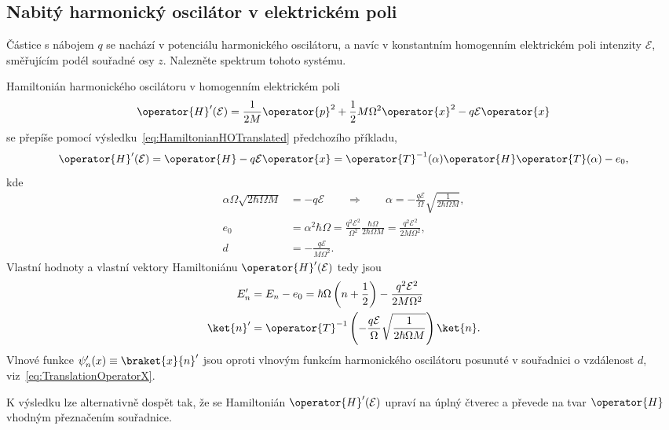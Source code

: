 \subsection{Nabitý harmonický oscilátor v elektrickém poli}
	Částice s nábojem $q$ se nachází v potenciálu harmonického oscilátoru, a navíc v konstantním homogenním elektrickém poli intenzity $\mathcal{E}$, směřujícím podél souřadné osy $z$.
	Nalezněte spektrum tohoto systému.
	
\begin{solution}
	Hamiltonián harmonického oscilátoru v homogenním elektrickém poli
	\begin{equation}\label{eq:HamiltonianHOCharged}
		\operator{H}'(\mathcal{E})=\frac{1}{2M}\operator{p}^{2}+\frac{1}{2}M\Omega^{2}\operator{x}^{2}
			-q\mathcal{E}\operator{x}
	\end{equation}
	se přepíše pomocí výsledku~\eqref{eq:HamiltonianHOTranslated} předchozího příkladu,
	\begin{equation}
		\operator{H}'(\mathcal{E})
			=\operator{H}-q\mathcal{E}\operator{x}
			=\operator{T}^{-1}(\alpha)\operator{H}\operator{T}(\alpha)-e_{0},
	\end{equation}
	kde
	\begin{subequations}
		\begin{align}
			\alpha\Omega\sqrt{2\hbar\Omega M}&=-q\mathcal{E}\qquad\Rightarrow\qquad
			\alpha=-\frac{q\mathcal{E}}{\Omega}\sqrt{\frac{1}{2\hbar\Omega M}},\\		
			e_{0}&=\alpha^{2}\hbar\Omega
				=\frac{q^{2}\mathcal{E}^{2}}{\Omega^{2}}\frac{\hbar\Omega}{2\hbar\Omega M}
				=\frac{q^{2}\mathcal{E}^{2}}{2M\Omega^{2}},\\
			d&=-\frac{q\mathcal{E}}{M\Omega^{2}}.
		\end{align}				
	\end{subequations}
	Vlastní hodnoty a vlastní vektory Hamiltoniánu $\operator{H}'(\mathcal{E})$ tedy jsou
	\begin{subequations}
		\begin{align}
			E_{n}'&=E_{n}-e_{0}=\hbar\Omega\left(n+\frac{1}{2}\right)
				-\frac{q^{2}\mathcal{E}^{2}}{2M\Omega^{2}}\\
			\ket{n}'&=\operator{T}^{-1}\left(-\frac{q\mathcal{E}}{\Omega}\sqrt{\frac{1}{2\hbar\Omega M}}\right)
				\ket{n}.
		\end{align}
	\end{subequations}
	Vlnové funkce $\psi'_{n}(x)\equiv\braket{x}{n}'$ jsou oproti vlnovým funkcím harmonického oscilátoru posunuté v souřadnici o vzdálenost $d$, viz~\eqref{eq:TranslationOperatorX}.
	
	K výsledku lze alternativně dospět tak, že se Hamiltonián $\operator{H}'(\mathcal{E})$ upraví na úplný čtverec a převede na tvar $\operator{H}$ vhodným přeznačením souřadnice.
\end{solution}
